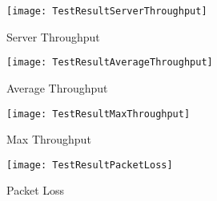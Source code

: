 \begin{figure}[ht]
\centering
\texttt{[image: TestResultServerThroughput]}
\caption{Server Throughput}
\label{fig:tr-st}
\end{figure}

\begin{figure}[ht]
\centering
\texttt{[image: TestResultAverageThroughput]}
\caption{Average Throughput}
\label{fig:tr-at}
\end{figure}

\begin{figure}[ht]
\centering
\texttt{[image: TestResultMaxThroughput]}
\caption{Max Throughput}
\label{fig:tr-mt}
\end{figure}

\begin{figure}[ht]
\centering
\texttt{[image: TestResultPacketLoss]}
\caption{Packet Loss}
\label{fig:tr-pl}
\end{figure}